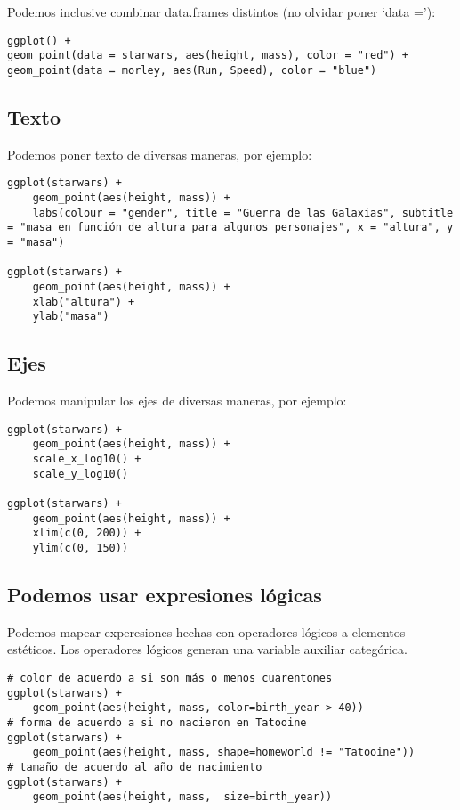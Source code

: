 \documentclass[]{article}
\begin{document}
Podemos inclusive combinar data.frames distintos (no olvidar poner `data
='):

\begin{verbatim}
ggplot() + 
geom_point(data = starwars, aes(height, mass), color = "red") + 
geom_point(data = morley, aes(Run, Speed), color = "blue")
\end{verbatim}

\hypertarget{texto}{%
\subsection{Texto}\label{texto}}

Podemos poner texto de diversas maneras, por ejemplo:

\begin{verbatim}
ggplot(starwars) + 
    geom_point(aes(height, mass)) + 
    labs(colour = "gender", title = "Guerra de las Galaxias", subtitle = "masa en función de altura para algunos personajes", x = "altura", y = "masa")

ggplot(starwars) + 
    geom_point(aes(height, mass)) + 
    xlab("altura") + 
    ylab("masa")
\end{verbatim}

\hypertarget{ejes}{%
\subsection{Ejes}\label{ejes}}

Podemos manipular los ejes de diversas maneras, por ejemplo:

\begin{verbatim}
ggplot(starwars) + 
    geom_point(aes(height, mass)) + 
    scale_x_log10() + 
    scale_y_log10()

ggplot(starwars) + 
    geom_point(aes(height, mass)) + 
    xlim(c(0, 200)) + 
    ylim(c(0, 150))
\end{verbatim}

\hypertarget{podemos-usar-expresiones-luxf3gicas}{%
\subsection{Podemos usar expresiones
lógicas}\label{podemos-usar-expresiones-luxf3gicas}}

Podemos mapear experesiones hechas con operadores lógicos a elementos
estéticos. Los operadores lógicos generan una variable auxiliar
categórica.

\begin{verbatim}
# color de acuerdo a si son más o menos cuarentones
ggplot(starwars) + 
    geom_point(aes(height, mass, color=birth_year > 40))
# forma de acuerdo a si no nacieron en Tatooine
ggplot(starwars) + 
    geom_point(aes(height, mass, shape=homeworld != "Tatooine"))
# tamaño de acuerdo al año de nacimiento
ggplot(starwars) + 
    geom_point(aes(height, mass,  size=birth_year))
\end{verbatim}
\end{document}
